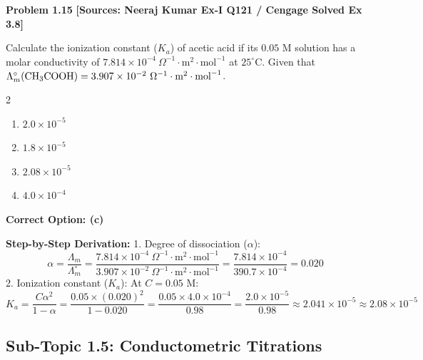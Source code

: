 \begin{problembox}
\textbf{Problem 1.15} \hfill \textbf{[Sources: Neeraj Kumar Ex-I Q121 / Cengage Solved Ex 3.8]}

Calculate the ionization constant ($K_a$) of acetic acid if its $0.05\text{ M}$ solution has a molar conductivity of $7.814 \times 10^{-4}\ \Omega^{-1}\cdot\text{m}^2\cdot\text{mol}^{-1}$ at $25^\circ\text{C}$. Given that $\Lambda_m^\circ(\ce{CH3COOH}) = 3.907 \times 10^{-2}\ \Omega^{-1}\cdot\text{m}^2\cdot\text{mol}^{-1}$.
\begin{multicols}{2}
\begin{enumerate}[label=(\alph*)]
    \item $2.0 \times 10^{-5}$
    \item $1.8 \times 10^{-5}$
    \item $2.08 \times 10^{-5}$
    \item $4.0 \times 10^{-4}$
\end{enumerate}
\end{multicols}
\end{problembox}
\begin{solution}
\textbf{Correct Option: (c)}

\textbf{Step-by-Step Derivation:}
1. Degree of dissociation ($\alpha$):
\begin{equation*}
    \alpha = \frac{\Lambda_m}{\Lambda_m^\circ} = \frac{7.814 \times 10^{-4}\ \Omega^{-1}\cdot\text{m}^2\cdot\text{mol}^{-1}}{3.907 \times 10^{-2}\ \Omega^{-1}\cdot\text{m}^2\cdot\text{mol}^{-1}} = \frac{7.814 \times 10^{-4}}{390.7 \times 10^{-4}} = 0.020
\end{equation*}
2. Ionization constant ($K_a$):
At $C = 0.05\text{ M}$:
\begin{equation*}
    K_a = \frac{C \alpha^2}{1 - \alpha} = \frac{0.05 \times (0.020)^2}{1 - 0.020} = \frac{0.05 \times 4.0 \times 10^{-4}}{0.98} = \frac{2.0 \times 10^{-5}}{0.98} \approx 2.041 \times 10^{-5} \approx 2.08 \times 10^{-5}
\end{equation*}
\end{solution}

\subsection{Sub-Topic 1.5: Conductometric Titrations}

